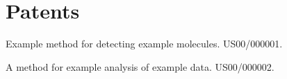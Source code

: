 \section{\sc Patents}

Example method for detecting example molecules. US00/000001.

A method for example analysis of example data. US00/000002.
